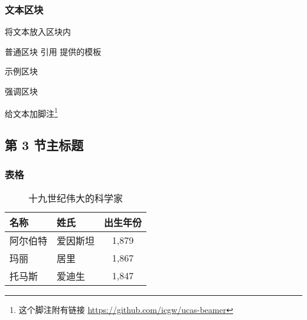 \documentclass[10pt,utf8]{beamer}
\begin{document}
\begin{frame}[t]
  \frametitle{文本区块}
  将文本放入区块内
  \begin{block}{普通区块}
    引用 \autocite{guowei2019ucasbeamer} 提供的模板
  \end{block}
  \begin{exampleblock}{示例区块}
  \end{exampleblock}
  \begin{alertblock}{强调区块}
  \end{alertblock}
  给文本加脚注\footnote{这个脚注附有链接 \url{https://github.com/icgw/ucas-beamer}}
\end{frame}


\subsection[第 3 节缩写标题]{第 3 节主标题}

\begin{frame}[t]
  \frametitle{表格}
  \begin{table}
    \begin{tabular}{llc}\toprule
      名称     & 姓氏     & 出生年份  \\ \midrule
      阿尔伯特 & 爱因斯坦 & 1,879     \\
      玛丽     & 居里     & 1,867     \\
      托马斯   & 爱迪生   & 1,847     \\ \bottomrule
    \end{tabular}
    \caption{十九世纪伟大的科学家}
  \end{table}
\end{frame}
\end{document}
